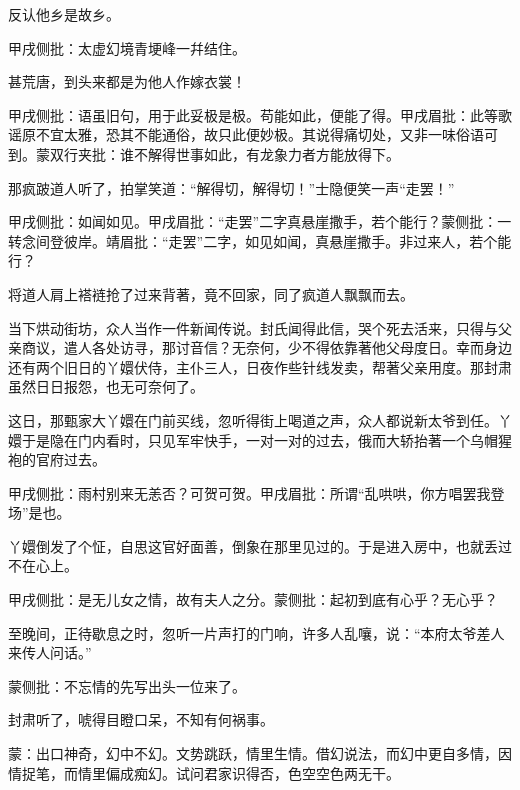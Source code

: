 \begin{poem}
    \begin{pl}反认他乡是故乡。\end{pl}\begin{note}甲戌侧批：太虚幻境青埂峰一幷结住。\end{note}

    \begin{pl}甚荒唐，到头来都是为他人作嫁衣裳！\end{pl}\begin{note}甲戌侧批：语虽旧句，用于此妥极是极。苟能如此，便能了得。甲戌眉批：此等歌谣原不宜太雅，恐其不能通俗，故只此便妙极。其说得痛切处，又非一味俗语可到。蒙双行夹批：谁不解得世事如此，有龙象力者方能放得下。\end{note}
\end{poem}


\begin{parag}
    那疯跛道人听了，拍掌笑道：“解得切，解得切！”士隐便笑一声“走罢！”\begin{note}甲戌侧批：如闻如见。甲戌眉批：“走罢”二字真悬崖撒手，若个能行？蒙侧批：一转念间登彼岸。靖眉批：“走罢”二字，如见如闻，真悬崖撒手。非过来人，若个能行？\end{note}将道人肩上褡裢抢了过来背著，竟不回家，同了疯道人飘飘而去。
\end{parag}


\begin{parag}
    当下烘动街坊，众人当作一件新闻传说。封氏闻得此信，哭个死去活来，只得与父亲商议，遣人各处访寻，那讨音信？无奈何，少不得依靠著他父母度日。幸而身边还有两个旧日的丫嬛伏侍，主仆三人，日夜作些针线发卖，帮著父亲用度。那封肃虽然日日报怨，也无可奈何了。
\end{parag}


\begin{parag}
    这日，那甄家大丫嬛在门前买线，忽听得街上喝道之声，众人都说新太爷到任。丫嬛于是隐在门内看时，只见军牢快手，一对一对的过去，俄而大轿抬著一个乌帽猩袍的官府过去。\begin{note}甲戌侧批：雨村别来无恙否？可贺可贺。甲戌眉批：所谓“乱哄哄，你方唱罢我登场”是也。\end{note}丫嬛倒发了个怔，自思这官好面善，倒象在那里见过的。于是进入房中，也就丢过不在心上。\begin{note}甲戌侧批：是无儿女之情，故有夫人之分。蒙侧批：起初到底有心乎？无心乎？\end{note}至晚间，正待歇息之时，忽听一片声打的门响，许多人乱嚷，说：“本府太爷差人来传人问话。”\begin{note}蒙侧批：不忘情的先写出头一位来了。\end{note}封肃听了，唬得目瞪口呆，不知有何祸事。
\end{parag}


\begin{parag}
    \begin{note}蒙：出口神奇，幻中不幻。文势跳跃，情里生情。借幻说法，而幻中更自多情，因情捉笔，而情里偏成痴幻。试问君家识得否，色空空色两无干。\end{note}
\end{parag}

